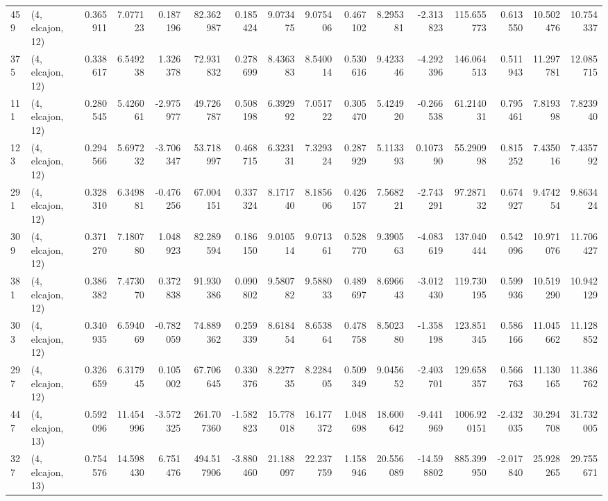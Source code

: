 \begin{tabular}{llrrrrrrrrrrrrrr}
459 &  (4, elcajon, 12) &   0.365911 &   7.077123 &   0.187196 &    82.362987 &   0.185424 &   9.073475 &   9.075406 &  0.467102 &   8.295381 &  -2.313823 &   115.655773 &  0.613550 &  10.502476 &  10.754337 \\
375 &  (4, elcajon, 12) &   0.338617 &   6.549238 &   1.326378 &    72.931832 &   0.278699 &   8.436383 &   8.540014 &  0.530616 &   9.423346 &  -4.292396 &   146.064513 &  0.511943 &  11.297781 &  12.085715 \\
111 &  (4, elcajon, 12) &   0.280545 &   5.426061 &  -2.975977 &    49.726787 &   0.508198 &   6.392992 &   7.051722 &  0.305470 &   5.424920 &  -0.266538 &    61.214031 &  0.795461 &   7.819398 &   7.823940 \\
123 &  (4, elcajon, 12) &   0.294566 &   5.697232 &  -3.706347 &    53.718997 &   0.468715 &   6.323131 &   7.329324 &  0.287929 &   5.113393 &   0.107390 &    55.290998 &  0.815252 &   7.435016 &   7.435792 \\
291 &  (4, elcajon, 12) &   0.328310 &   6.349881 &  -0.476256 &    67.004151 &   0.337324 &   8.171740 &   8.185606 &  0.426157 &   7.568221 &  -2.743291 &    97.287132 &  0.674927 &   9.474254 &   9.863424 \\
309 &  (4, elcajon, 12) &   0.371270 &   7.180780 &   1.048923 &    82.289594 &   0.186150 &   9.010514 &   9.071361 &  0.528770 &   9.390563 &  -4.083619 &   137.040444 &  0.542096 &  10.971076 &  11.706427 \\
381 &  (4, elcajon, 12) &   0.386382 &   7.473070 &   0.372838 &    91.930386 &   0.090802 &   9.580782 &   9.588033 &  0.489697 &   8.696643 &  -3.012430 &   119.730195 &  0.599936 &  10.519290 &  10.942129 \\
303 &  (4, elcajon, 12) &   0.340935 &   6.594069 &  -0.782059 &    74.889362 &   0.259339 &   8.618454 &   8.653864 &  0.478758 &   8.502380 &  -1.358198 &   123.851345 &  0.586166 &  11.045662 &  11.128852 \\
297 &  (4, elcajon, 12) &   0.326659 &   6.317945 &   0.105002 &    67.706645 &   0.330376 &   8.227735 &   8.228405 &  0.509349 &   9.045652 &  -2.403701 &   129.658357 &  0.566763 &  11.130165 &  11.386762 \\
447 &  (4, elcajon, 13) &   0.592096 &  11.454996 &  -3.572325 &   261.707360 &  -1.582823 &  15.778018 &  16.177372 &  1.048698 &  18.600642 &  -9.441969 &  1006.920151 & -2.432035 &  30.294708 &  31.732005 \\
327 &  (4, elcajon, 13) &   0.754576 &  14.598430 &   6.751476 &   494.517906 &  -3.880460 &  21.188097 &  22.237759 &  1.158946 &  20.556089 & -14.598802 &   885.399950 & -2.017840 &  25.928265 &  29.755671 \\

\end{tabular}
